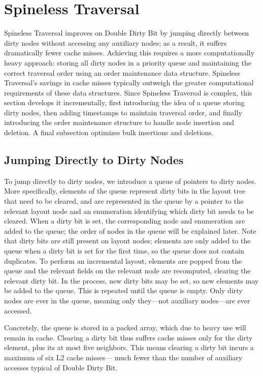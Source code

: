 \section{Spineless Traversal}

Spineless Traversal improves on Double Dirty Bit
  by jumping directly between dirty nodes
  without accessing any auxiliary nodes;
  as a result, it suffers dramatically fewer cache misses.
Achieving this requires a more computationally heavy approach:
  storing all dirty nodes in a priority queue
  and maintaining the correct traversal order
  using an order maintenance data structure.
Spineless Traversal's savings in cache misses
  typically outweigh the greater computational requirements
  of these data structures.
Since Spineless Traversal is complex,
  this section develops it incrementally,
  first introducing the idea of a queue storing dirty nodes,
  then adding timestamps to maintain traversal order,
  and finally introducing the order maintenance structure
  to handle node insertion and deletion.
A final subsection optimizes bulk insertions and deletions.

\subsection{Jumping Directly to Dirty Nodes}

To jump directly to dirty nodes,
  we introduce a queue of pointers to dirty nodes.
More specifically, elements of the queue represent
  dirty bits in the layout tree that need to be cleared,
  and are represented in the queue by
  a pointer to the relevant layout node
  and an enumeration identifying
  which dirty bit needs to be cleared.
When a dirty bit is set,
  the corresponding node and enumeration are added to the queue;
  the order of nodes in the queue will be explained later.
Note that dirty bits are still present on layout nodes;
  elements are only added to the queue
  when a dirty bit is set for the first time,
  so the queue does not contain duplicates.
To perform an incremental layout,
  elements are popped from the queue
  and the relevant fields on the relevant node are recomputed,
  clearing the relevant dirty bit.
In the process, new dirty bits may be set,
  so new elements may be added to the queue.
This is repeated until the queue is empty.
Only dirty nodes are ever in the queue,
  meaning only they---not auxiliary nodes---are ever accessed.

Concretely, the queue is stored in a packed array,
  which due to heavy use will remain in cache.
Clearing a dirty bit thus suffers cache misses
  only for the dirty element,
  plus its at most five neighbors.
This means clearing a dirty bit incurs
  a maximum of six L2 cache misses---%
  much fewer than the number of auxiliary accesses
  typical of Double Dirty Bit.

